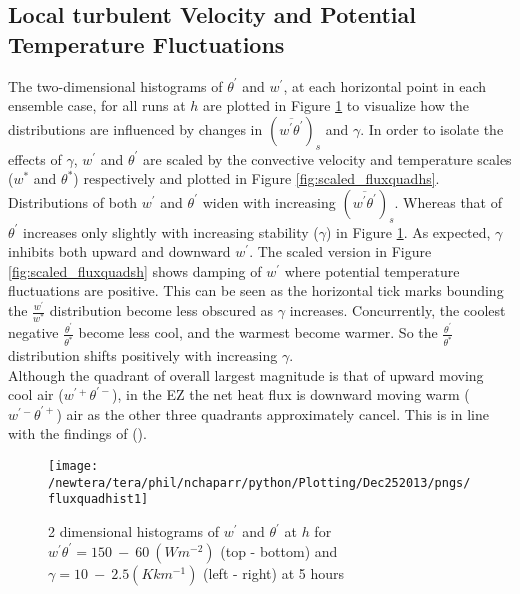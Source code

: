 \clearpage

\subsection{Local turbulent Velocity and Potential Temperature Fluctuations}
\label{subsec:fluxquadrants}     
\FloatBarrier

The two-dimensional histograms of $\theta^{'}$ and $w^{'}$, at each horizontal point in each ensemble case, for all runs at $h$ are plotted in Figure \ref{fig:fluxquadsh} to visualize how the distributions are influenced by changes in $(\overline{w^{'} \theta^{'}})_{s}$ and $\gamma$.  In order to isolate the effects of $\gamma$,  $w^{'}$ and $\theta^{'}$ are scaled by the convective velocity and temperature scales ($w^{*}$ and $\theta^{*}$) respectively and plotted in Figure \ref{fig:scaled_fluxquadhs}.\\

Distributions of both $w^{'}$ and $\theta^{'}$ widen with increasing $(\overline{w^{'}\theta^{'}})_{s}$.  Whereas that of $\theta^{'}$ increases only slightly with increasing stability ($\gamma$) in Figure \ref{fig:fluxquadsh}.  As expected, $\gamma$ inhibits both upward and downward $w^{'}$. The scaled version in Figure \ref{fig:scaled_fluxquadsh} shows damping of $w^{'}$ where potential temperature fluctuations are positive.  This can be seen as the horizontal tick marks bounding the $\frac{w^{'}}{w^{*}}$ distribution become less obscured as $\gamma$ increases.  Concurrently, the coolest negative $\frac{\theta^{'}}{\theta^{*}}$ become less cool, and the warmest become warmer.  So the $\frac{\theta^{'}}{\theta^{*}}$ distribution shifts positively with increasing $\gamma$.\\ 

Although the quadrant of overall largest magnitude is that of upward moving cool air ($w^{'+}\theta^{'-}$), in the \acs{EZ} the net heat flux is downward moving warm ($w^{'-}\theta^{'+}$) air as the other three quadrants approximately cancel.  This is in line with the findings of \citeauthor{SullMoengStev} (\citeyear{SullMoengStev}). \\


\begin{figure}[htbp]
\centering
 \texttt{[image: /newtera/tera/phil/nchaparr/python/Plotting/Dec252013/pngs/fluxquadhist1]}                 
\caption[Two-dimensional distributions of $w^{'}$ and $\theta^{'}$ for all runs]{ 2 dimensional histograms of $w^{'}$ and $\theta^{'}$ at $h$ for $w^{'}\theta^{'} = 150 \ - \ 60\ (Wm^{-2})$ (top - bottom) and $\gamma = 10 \ - \  2.5 (Kkm^{-1})$ (left - right) at 5 hours}
\label{fig:fluxquadsh}
\end{figure}

